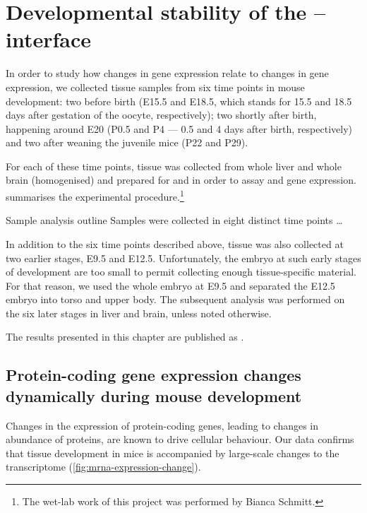 \chapter{Developmental stability of the \mrna--\trna interface}

In order to study how changes in \mrna gene expression relate to changes in
\trna gene expression, we collected tissue samples from six time points in mouse
development: two before birth (E15.5 and E18.5, which stands for \num{15.5} and
\num{18.5} days after gestation of the oocyte, respectively); two shortly after
birth, happening around E20 (P0.5 and P4 --- \num{0.5} and \num{4} days after
birth, respectively) and two after weaning the juvenile mice (P22 and P29).

For each of these time points, tissue was collected from whole liver and whole
brain (homogenised) and prepared for \rnaseq and  \chipseq in order to
assay \mrna and \trna gene expression. 
summarises the experimental procedure.\footnote{The wet-lab work of this project
was performed by Bianca Schmitt.}

    {Sample analysis outline}
    {Samples were collected in eight distinct time points …}

In addition to the six time points described above, tissue was also collected at
two earlier stages, E9.5 and E12.5. Unfortunately, the embryo at such early
stages of development are too small to permit collecting enough tissue-specific
material. For that reason, we used the whole embryo at E9.5 and separated the
E12.5 embryo into torso and upper body. The subsequent analysis was performed on
the six later stages in liver and brain, unless noted otherwise.

The results presented in this chapter are published as \citet{Schmitt:2014}.


\section{Protein-coding gene expression changes dynamically during mouse
development}

Changes in the expression of protein-coding genes, leading to changes in
abundance of proteins, are known to drive cellular behaviour. Our data
confirms that tissue development in mice is accompanied by large-scale changes
to the \mrna transcriptome (\cref{fig:mrna-expression-change}).

